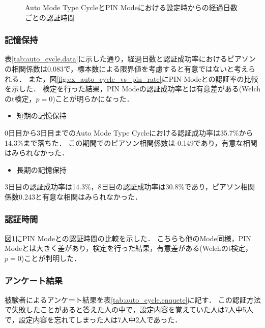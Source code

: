\begin{figure}[b]
  \begin{center}
  \end{center}
  \caption{Auto Mode Type CycleとPIN Modeにおける設定時からの経過日数ごとの認証時間}
  \label{fig:ex_auto_cycle_vs_pin_time}
\end{figure}

\subsubsection{記憶保持}
表\ref{tab:auto_cycle.data}に示した通り，経過日数と認証成功率におけるピアソンの相関係数は0.083で，標本数による限界値を考慮すると有意ではないと考えられる．
また，図\ref{fig:ex_auto_cycle_vs_pin_rate}にPIN Modeとの認証率の比較を示した．
検定を行った結果，PIN Modeの認証成功率とは有意差がある(Welchのt検定，$ p = 0 $)ことが明らかになった．
\begin{itemize}
  \item 短期の記憶保持
\end{itemize}
0日目から3日目までのAuto Mode Type Cycleにおける認証成功率は35.7\%から14.3\%まで落ちた．
この期間でのピアソン相関係数は-0.149であり，有意な相関はみられなかった．

\begin{itemize}
  \item 長期の記憶保持
\end{itemize}
3日目の認証成功率は14.3\%，8日目の認証成功率は30.8\%であり，ピアソン相関係数0.243と有意な相関はみられなかった．

\subsubsection{認証時間}
図\ref{fig:ex_auto_cycle_vs_pin_time}にPIN Modeとの認証時間の比較を示した．
こちらも他のMode同様，PIN Modeとは大きく差があり，検定を行った結果，有意差がある(Welchのt検定，$ p = 0 $)ことが判明した．

\subsubsection{アンケート結果}
被験者によるアンケート結果を表\ref{tab:auto_cycle.enquete}に記す．
この認証方法で失敗したことがあると答えた人の中で，設定内容を覚えていた人は7人中5人で，設定内容を忘れてしまった人は7人中2人であった．

